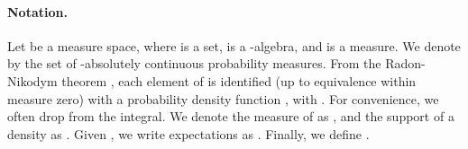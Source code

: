 \documentclass{article}
\begin{document}
\begin{comment}
Summing up, the main contributions of this paper are:
\begin{itemize}[nosep]
    \item We extend sparsemax, regularized prediction maps, and FY losses to arbitrary (possibly continuous) densities.
    \item We present -sparse families. For , the densities in these families have varying, sparse supports. Some new distributions are constructed, namely the \textit{truncated parabola} (2-sparse counterpart of the Gaussian).
    \item We develop new attention mechanisms for continuous domains, revealing a connection between their Jacobian and generalized covariances. We use it to obtain an efficient backpropagation algorithm, applying it to document classification and machine translation tasks.
    \item We show that properties of FY losses hold for general -sparse families, including convexity and closed-form gradient w.r.t.\ their canonical parameters. We use this to perform interval regression, which returns mean estimates and intervals, based on the support of their distribution.
\end{itemize}
\end{comment}

\paragraph{Notation.}
Let  be a measure space, 
where  is a set,  is a -algebra, and  is a measure. 
We denote by  the set of -absolutely continuous probability measures. From the Radon-Nikodym theorem \citep[\S31]{halmos2013measure}, each element of  is identified (up to equivalence within measure zero) with a probability density function , with . 
For convenience, we often drop  from the integral. We denote the measure of  as
, and  
the support of a density  as . 
Given , we write expectations 
as
.  Finally, we define . 

\begin{comment}
\paragraph{Notation.}
Let  be a measure space. 
If  is finite, we take   and  the counting measure. If ,  is the Borel -algebra and  the Lebesgue measure. The set of -absolutely continuous probability measures is denoted as , which is a convex set. From the Radon-Nikodym theorem \citep[\S31]{halmos2013measure}, each element of  is identified (up to equivalence within measure zero) with a probability density function , with . We write, with some abuse of notation, .
If the base measure is clear from the context, we often drop  from the integral, writing  instead of , for some .
We denote the measure of  as
, and  
the support of a density  by . 
Given functions  and , we write expectations and covariances  as
 and
.
Finally, we define  if , and , if . 
\end{comment}
\end{document}
